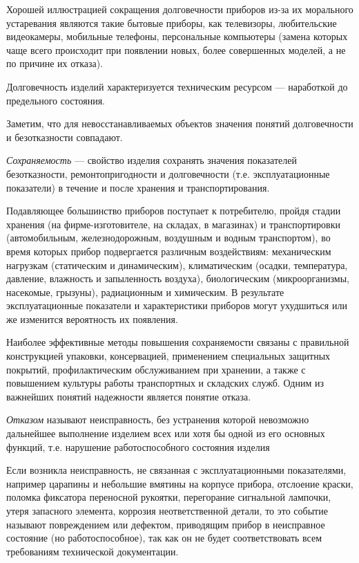 Хорошей иллюстрацией сокращения долговечности приборов из-за их морального устаревания являются такие бытовые приборы, как телевизоры, любительские видеокамеры, мобильные телефоны, персональные компьютеры (замена которых чаще всего происходит при появлении новых, более совершенных моделей, а не по причине их отказа).

Долговечность изделий характеризуется техническим ресурсом --- наработкой до предельного состояния.

Заметим, что для невосстанавливаемых объектов значения понятий долговечности и безотказности совпадают.

\textit{Сохраняемость} --- свойство изделия сохранять значения показателей безотказности, ремонтопригодности и долговечности (т.е. эксплуатационные показатели) в течение и после хранения и транспортирования.

Подавляющее большинство приборов поступает к потребителю, пройдя стадии хранения (на фирме-изготовителе, на складах, в магазинах) и транспортировки (автомобильным, железнодорожным, воздушным и водным транспортом), во время которых прибор подвергается различным воздействиям: механическим нагрузкам (статическим и динамическим), климатическим (осадки, температура, давление, влажность и запыленность воздуха), биологическим (микроорганизмы, насекомые, грызуны), радиационным и химическим. В результате эксплуатационные показатели и характеристики приборов могут ухудшиться или же изменится вероятность их появления.

Наиболее эффективные методы повышения сохраняемости связаны с правильной конструкцией упаковки, консервацией, применением специальных защитных покрытий, профилактическим обслуживанием при хранении, а также с повышением культуры работы транспортных и складских служб.
Одним из важнейших понятий надежности является понятие отказа.

\textit{Отказом} называют неисправность, без устранения которой невозможно дальнейшее выполнение изделием всех или хотя бы одной из его основных функций, т.е. нарушение работоспособного состояния изделия 

Если возникла неисправность, не связанная с эксплуатационными показателями, например царапины и небольшие вмятины на корпусе прибора, отслоение краски, поломка фиксатора переносной рукоятки, перегорание сигнальной лампочки, утеря запасного элемента, коррозия неответственной детали, то это событие называют повреждением или дефектом, приводящим прибор в неисправное состояние (но работоспособное), так как он не будет соответствовать всем требованиям технической документации.

